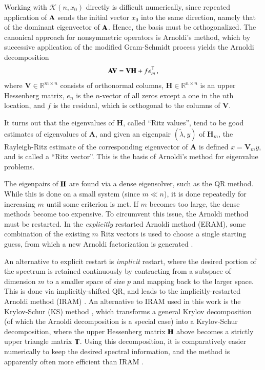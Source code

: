 Working with $\mathcal{K}(n, x_0)$ directly is difficult numerically, since
repeated application of $\mathbf{A}$ sends the initial vector $x_0$ into the
same direction, namely that of the dominant eigenvector of $\mathbf{A}$.  
Hence, the basis 
must be orthogonalized. The canonical approach for nonsymmetric 
operators is Arnoldi's method, which by successive application of the 
modified Gram-Schmidt process yields the Arnoldi decomposition
\begin{equation}
 \mathbf{A}\mathbf{V} = \mathbf{V} \mathbf{H} + fe^{\mathsf{T}}_m \, ,
\end{equation}
where $\mathbf{V} \in \mathbb{R}^{m\times n}$  consists of
orthonormal columns,
$\mathbf{H} \in \mathbb{R}^{n \times n} $ is an upper Hessenberg matrix, 
$e_n$ is the
$n$-vector of all zeros except a one in the $n$th location, and $f$ is 
the residual, which is orthogonal to the columns of $\mathbf{V}$.  

It turns out that the eigenvalues of $\mathbf{H}$, called ``Ritz values'', tend to
be good estimates of eigenvalues of $\mathbf{A}$, and given an eigenpair
$(\tilde{\lambda}, y)$ of $\mathbf{H}_m$, the Rayleigh-Ritz estimate of the
corresponding eigenvector of $\mathbf{A}$ is defined $x = \mathbf{V}_m y$, and
is called a ``Ritz vector''.  This is the basis of Arnoldi's method for 
eigenvalue problems.

The eigenpairs of $\mathbf{H}$ are found via a dense eigensolver, such as 
the QR method.  While this is done on a small system (since $m \ll n$), 
it is done repeatedly for increasing $m$ until some criterion is met.  
If $m$ becomes too large, the dense methods become too expensive.  To 
circumvent this issue, the Arnoldi method must be restarted.  In 
the {\it explicitly} restarted Arnoldi method (ERAM), some combination of 
the existing $m$ Ritz vectors is used to choose a single starting guess, 
from which a new Arnoldi factorization is generated \cite{slepc-str-4}.

An alternative to explicit restart is {\it implicit} restart, where the 
desired portion of the spectrum is retained continuously by contracting 
from a subspace of dimension $m$ to a smaller space of size $p$ and mapping 
back to the larger space.  This is done via implicitly-shifted QR, and leads 
to the implicitly-restarted Arnoldi method (IRAM) \cite{sorensen1992iap}.  
An alternative to IRAM used in this work is the Krylov-Schur (KS) method
\cite{stewart2002ksa}, which transforms a general Krylov decomposition 
(of which the Arnoldi decomposition is a special case) into a Krylov-Schur 
decomposition, where the upper Hessenberg matrix $\mathbf{H}$ 
above becomes a strictly upper triangle matrix $\mathbf{T}$.  
Using this decomposition, it is comparatively
easier numerically to keep the desired spectral information, and the 
method is apparently often more efficient than IRAM \cite{slepc-str-7}. 

